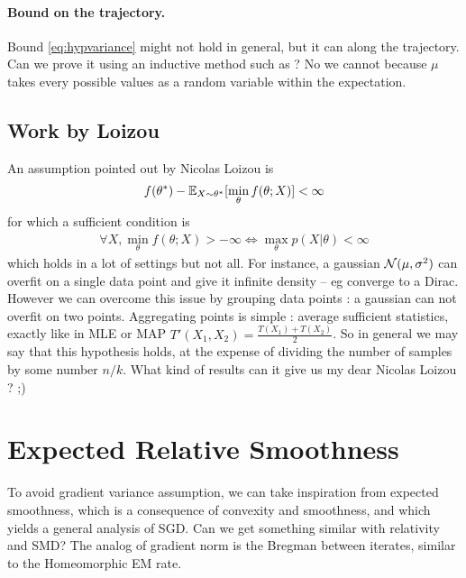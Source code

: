 \documentclass{article}
\newcommand{\natp}{\theta}
\begin{document}
\paragraph{Bound on the trajectory.}
Bound \eqref{eq:hypvariance} might not hold in general, but it can along the trajectory. Can we prove it using an inductive method such as \citet[Appendix A]{lacoste2012simpler}?
No we cannot because $\mu$ takes every possible values as a random variable within the expectation.


\subsection{Work by Loizou}
An assumption pointed out by Nicolas Loizou is 
\begin{align}
	f(\natp^*) - \E_{X\sim\natp^*}[\min_\natp f(\natp ; X)] < \infty
\end{align}
for which a sufficient condition is 
\begin{align}
\forall X, \min_\natp f(\natp ; X) >	 - \infty \iff \max_\natp p(X|\natp) < \infty
\end{align}
which holds in a lot of settings but not all. For instance, a gaussian ${\mathcal N}(\mu,\sigma^2)$ can overfit on a single data point and give it infinite density -- eg converge to a Dirac. However we can overcome this issue by grouping data points : a gaussian can not overfit on two points. Aggregating points is simple : average sufficient statistics, exactly like in MLE or MAP $T'(X_1,X_2) = \frac{T(X_1) + T(X_2)}{2}$. 
So in general we may say that this hypothesis holds, at the expense of dividing the number of samples by some number $n/k$. What kind of results can it give us my dear Nicolas Loizou ? ;)


\section{Expected Relative Smoothness}
To avoid gradient variance assumption, we can take inspiration from expected smoothness, which is a consequence of convexity and smoothness, and which yields a general analysis of SGD. Can we get something similar with relativity and SMD? 
The analog of gradient norm is the Bregman between iterates, similar to the Homeomorphic EM rate. 


\end{document}
